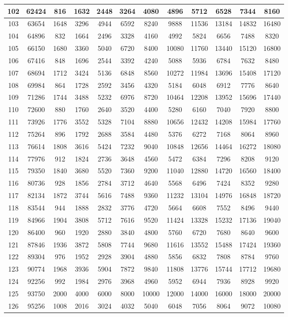 \begin{center}
\begin{longtable}{|c|c|c|c|c|c|c|c|c|c|c|c|}
\hline
102 & 62424 & 816 & 1632 & 2448 & 3264 & 4080 & 4896 & 5712 & 6528 & 7344 & 8160\tabularnewline
\hline
103 & 63654 & 1648 & 3296 & 4944 & 6592 & 8240 & 9888 & 11536 & 13184 & 14832 & 16480\tabularnewline
\hline
104 & 64896 & 832 & 1664 & 2496 & 3328 & 4160 & 4992 & 5824 & 6656 & 7488 & 8320\tabularnewline
\hline
105 & 66150 & 1680 & 3360 & 5040 & 6720 & 8400 & 10080 & 11760 & 13440 & 15120 & 16800\tabularnewline
\hline
106 & 67416 & 848 & 1696 & 2544 & 3392 & 4240 & 5088 & 5936 & 6784 & 7632 & 8480\tabularnewline
\hline
107 & 68694 & 1712 & 3424 & 5136 & 6848 & 8560 & 10272 & 11984 & 13696 & 15408 & 17120\tabularnewline
\hline
108 & 69984 & 864 & 1728 & 2592 & 3456 & 4320 & 5184 & 6048 & 6912 & 7776 & 8640\tabularnewline
\hline
109 & 71286 & 1744 & 3488 & 5232 & 6976 & 8720 & 10464 & 12208 & 13952 & 15696 & 17440\tabularnewline
\hline
110 & 72600 & 880 & 1760 & 2640 & 3520 & 4400 & 5280 & 6160 & 7040 & 7920 & 8800\tabularnewline
\hline
111 & 73926 & 1776 & 3552 & 5328 & 7104 & 8880 & 10656 & 12432 & 14208 & 15984 & 17760\tabularnewline
\hline
112 & 75264 & 896 & 1792 & 2688 & 3584 & 4480 & 5376 & 6272 & 7168 & 8064 & 8960\tabularnewline
\hline
113 & 76614 & 1808 & 3616 & 5424 & 7232 & 9040 & 10848 & 12656 & 14464 & 16272 & 18080\tabularnewline
\hline
114 & 77976 & 912 & 1824 & 2736 & 3648 & 4560 & 5472 & 6384 & 7296 & 8208 & 9120\tabularnewline
\hline
115 & 79350 & 1840 & 3680 & 5520 & 7360 & 9200 & 11040 & 12880 & 14720 & 16560 & 18400\tabularnewline
\hline
116 & 80736 & 928 & 1856 & 2784 & 3712 & 4640 & 5568 & 6496 & 7424 & 8352 & 9280\tabularnewline
\hline
117 & 82134 & 1872 & 3744 & 5616 & 7488 & 9360 & 11232 & 13104 & 14976 & 16848 & 18720\tabularnewline
\hline
118 & 83544 & 944 & 1888 & 2832 & 3776 & 4720 & 5664 & 6608 & 7552 & 8496 & 9440\tabularnewline
\hline
119 & 84966 & 1904 & 3808 & 5712 & 7616 & 9520 & 11424 & 13328 & 15232 & 17136 & 19040\tabularnewline
\hline
120 & 86400 & 960 & 1920 & 2880 & 3840 & 4800 & 5760 & 6720 & 7680 & 8640 & 9600\tabularnewline
\hline
121 & 87846 & 1936 & 3872 & 5808 & 7744 & 9680 & 11616 & 13552 & 15488 & 17424 & 19360\tabularnewline
\hline
122 & 89304 & 976 & 1952 & 2928 & 3904 & 4880 & 5856 & 6832 & 7808 & 8784 & 9760\tabularnewline
\hline
123 & 90774 & 1968 & 3936 & 5904 & 7872 & 9840 & 11808 & 13776 & 15744 & 17712 & 19680\tabularnewline
\hline
124 & 92256 & 992 & 1984 & 2976 & 3968 & 4960 & 5952 & 6944 & 7936 & 8928 & 9920\tabularnewline
\hline
125 & 93750 & 2000 & 4000 & 6000 & 8000 & 10000 & 12000 & 14000 & 16000 & 18000 & 20000\tabularnewline
\hline
126 & 95256 & 1008 & 2016 & 3024 & 4032 & 5040 & 6048 & 7056 & 8064 & 9072 & 10080\tabularnewline

\end{longtable}
\end{center}
